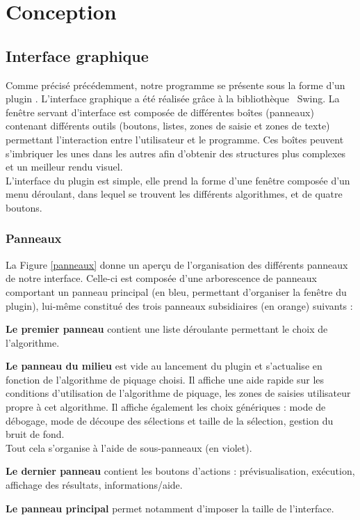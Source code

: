 
\newcommand{\black}{\color{black}}
\newcommand{\blue}{\color{blue}}

\chapter{Conception}

\section{Interface graphique}

Comme précisé précédemment, notre programme se présente sous la forme d'un plugin \imj . L'interface graphique a été réalisée grâce à la bibliothèque  \java ~Swing. 
La fenêtre servant d'interface est composée de différentes boîtes (panneaux) contenant différents outils (boutons, listes, zones de saisie et zones de texte) permettant l'interaction entre l'utilisateur et le programme. Ces boîtes peuvent s'imbriquer les unes dans les autres afin d'obtenir des structures plus complexes et un meilleur rendu visuel. \\
L'interface du plugin est simple, elle prend la forme d'une fenêtre composée d'un menu déroulant, dans lequel se trouvent les différents algorithmes, et de quatre boutons. 

\subsection{Panneaux}

La Figure \ref{panneaux} donne un aperçu de l'organisation des différents panneaux de notre interface. Celle-ci est composée d'une arborescence de panneaux comportant un panneau principal (en bleu, permettant d'organiser la fenêtre du plugin), lui-m\^eme constitué des trois panneaux subsidiaires (en orange) suivants :
\begin{description}
\item \textbf{Le premier panneau} contient une liste déroulante permettant le choix de l'algorithme. 
\item \textbf{Le panneau du milieu} est vide au lancement du plugin et s'actualise en fonction de l'algorithme de piquage choisi. Il affiche une aide rapide sur les conditions d'utilisation de l'algorithme de piquage, les zones de saisies utilisateur propre à cet algorithme. Il affiche également les choix génériques : mode de débogage, mode de découpe des sélections et taille de la sélection, gestion du bruit de fond. \\
Tout cela s'organise à l'aide de sous-panneaux (en violet).
\item \textbf{Le dernier panneau} contient les boutons d'actions : prévisualisation, exécution, affichage des résultats, informations/aide.
\item \textbf{Le panneau principal} permet notamment d'imposer la taille de l'interface.
\end{description}

